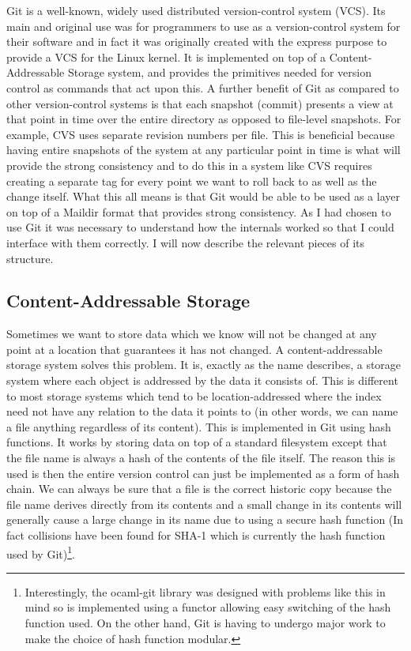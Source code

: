 Git\cite{code_git} is a well-known, widely used distributed version-control system (VCS). Its main and original use was for programmers to use as a version-control system for their software and in fact it was originally created with the express purpose to provide a VCS for the Linux kernel\cite{chacon2014git}. It is implemented on top of a Content-Addressable Storage system, and provides the primitives needed for version control as commands that act upon this. A further benefit of Git as compared to other version-control systems is that each snapshot (commit) presents a view at that point in time over the entire directory as opposed to file-level snapshots. For example, CVS\cite{code_cvs} uses separate revision numbers per file. This is beneficial because having entire snapshots of the system at any particular point in time is what will provide the strong consistency and to do this in a system like CVS requires creating a separate tag for every point we want to roll back to as well as the change itself. What this all means is that Git would be able to be used as a layer on top of a Maildir format that provides strong consistency. As I had chosen to use Git it was necessary to understand how the internals worked so that I could interface with them correctly. I will now describe the relevant pieces of its structure.

\subsection{Content-Addressable Storage}

Sometimes we want to store data which we know will not be changed at any point at a location that guarantees it has not changed. A content-addressable storage system solves this problem. It is, exactly as the name describes, a storage system where each object is addressed by the data it consists of. This is different to most storage systems which tend to be location-addressed where the index need not have any relation to the data it points to (in other words, we can name a file anything regardless of its content). This is implemented in Git using hash functions. It works by storing data on top of a standard filesystem except that the file name is always a hash of the contents of the file itself. The reason this is used is then the entire version control can just be implemented as a form of hash chain. We can always be sure that a file is the correct historic copy because the file name derives directly from its contents and a small change in its contents will generally cause a large change in its name due to using a secure hash function (In fact collisions have been found for SHA-1 which is currently the hash function used by Git)\footnote{Interestingly, the ocaml-git library was designed with problems like this in mind so is implemented using a functor allowing easy switching of the hash function used. On the other hand, Git is having to undergo major work to make the choice of hash function modular\cite{git_transition}.}.

